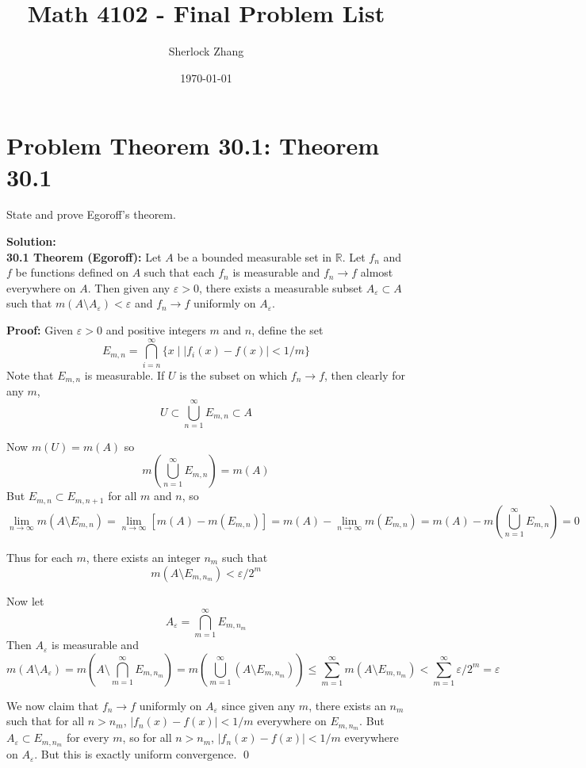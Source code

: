 \documentclass[a4paper]{article}
\title{Math 4102 - Final Problem List}
\author{Sherlock Zhang}
\date{\today}
\theoremstyle{definition}
\newcounter{problem}
\newenvironment{problem}[1][]
{
    \stepcounter{problem}
    \section*{Problem \theproblem\ifx\relax#1\relax\else: #1\fi}
}
{}
\newenvironment{solution}
{
    \noindent\textbf{Solution:}\\
}
{
    
}
\begin{document}
\maketitle


\begin{problem}[Theorem 30.1]

State and prove Egoroff's theorem.

\end{problem}

\vspace{2em}
\begin{solution}

\textbf{30.1 \quad Theorem (Egoroff):} Let $A$ be a bounded measurable set in $\mathbb{R}$. Let $f_n$ and $f$ be functions defined on $A$ such that each $f_n$ is measurable and $f_n \to f$ almost everywhere on $A$. Then given any $\varepsilon > 0$, there exists a measurable subset $A_\varepsilon \subset A$ such that $m(A \setminus A_\varepsilon) < \varepsilon$ and $f_n \to f$ uniformly on $A_\varepsilon$.

\medskip

\textbf{Proof:} Given $\varepsilon > 0$ and positive integers $m$ and $n$, define the set
\[
E_{m,n} = \bigcap_{i=n}^{\infty} \{x \mid |f_i(x) - f(x)| < 1/m\}
\]
Note that $E_{m,n}$ is measurable. If $U$ is the subset on which $f_n \to f$, then clearly for any $m$, 
\[
U \subset \bigcup_{n=1}^{\infty} E_{m,n} \subset A
\]

Now $m(U) = m(A)$ so
\[
m\!\left(\bigcup_{n=1}^{\infty} E_{m,n}\right) = m(A)
\]
But $E_{m,n} \subset E_{m,n+1}$ for all $m$ and $n$, so
\[
\lim_{n \to \infty} m(A \setminus E_{m,n})
= \lim_{n \to \infty} [m(A) - m(E_{m,n})]
= m(A) - \lim_{n \to \infty} m(E_{m,n})
= m(A) - m\!\left(\bigcup_{n=1}^{\infty} E_{m,n}\right)
= 0
\]

Thus for each $m$, there exists an integer $n_m$ such that
\[
m(A \setminus E_{m,n_m}) < \varepsilon / 2^m
\]

Now let
\[
A_\varepsilon = \bigcap_{m=1}^{\infty} E_{m,n_m}
\]
Then $A_\varepsilon$ is measurable and
\[
m(A \setminus A_\varepsilon)
= m\!\left(A \setminus \bigcap_{m=1}^{\infty} E_{m,n_m}\right)
= m\!\left(\bigcup_{m=1}^{\infty} (A \setminus E_{m,n_m})\right)
\le \sum_{m=1}^{\infty} m(A \setminus E_{m,n_m})
< \sum_{m=1}^{\infty} \varepsilon / 2^m
= \varepsilon
\]

We now claim that $f_n \to f$ uniformly on $A_\varepsilon$ since given any $m$, there exists an $n_m$ such that for all $n > n_m$, $|f_n(x) - f(x)| < 1/m$ everywhere on $E_{m,n_m}$. But $A_\varepsilon \subset E_{m,n_m}$ for every $m$, so for all $n > n_m$, $|f_n(x) - f(x)| < 1/m$ everywhere on $A_\varepsilon$. But this is exactly uniform convergence. \qed

\end{solution}
\end{document}
